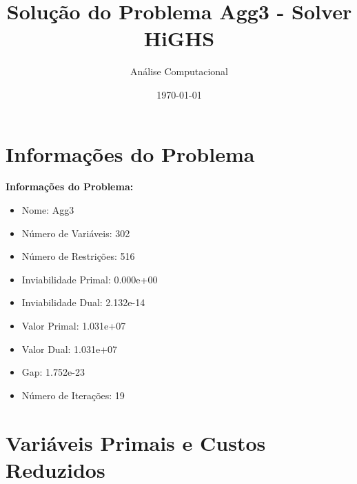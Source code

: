 \documentclass[12pt]{article}
\title{Solução do Problema Agg3 - Solver HiGHS}
\author{Análise Computacional}
\date{\today}
\begin{document}
\maketitle

\section{Informações do Problema}

\textbf{Informações do Problema:}
\begin{itemize}
\item Nome: Agg3
\item Número de Variáveis: 302
\item Número de Restrições: 516
\item Inviabilidade Primal: 0.000e+00
\item Inviabilidade Dual: 2.132e-14
\item Valor Primal: 1.031e+07
\item Valor Dual: 1.031e+07
\item Gap: 1.752e-23
\item Número de Iterações: 19
\end{itemize}


\section{Variáveis Primais e Custos Reduzidos}
\end{document}
